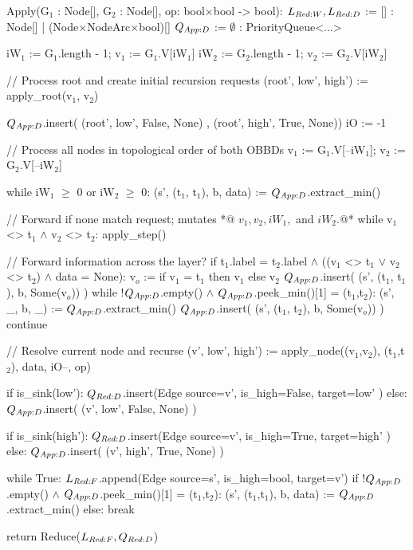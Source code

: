 \begin{blstlisting}
  Apply(G$_1$ : Node[], G$_2$ : Node[], op: bool$\times$bool ->    bool):
    $\ReduceLwork, \ReduceLdep$ := [] : Node[] | (Node$\times$NodeArc$\times$bool)[]
    $\ApplyQrec$ := $\emptyset$ : PriorityQueue<...>

    iW$_1$ := G$_1$.length - 1; v$_1$ := G$_1$.V[iW$_1$]
    iW$_2$ := G$_2$.length - 1; v$_2$ := G$_2$.V[iW$_2$]

    // Process root and create initial recursion requests
    (root', low', high') := apply_root(v$_1$, v$_2$)

    $\ApplyQrec$.insert( (root', low', False, None)
                , (root', high', True, None))
    iO := -1

    // Process all nodes in topological order of both OBBDs
    v$_1$ := G$_1$.V[--iW$_1$]; v$_2$ := G$_2$.V[--iW$_2$]

    while iW$_1$ $\geq$ 0 or iW$_2$ $\geq$ 0:
      (s', (t$_1$, t$_1$), b, data) := $\ApplyQrec$.extract_min()

      // Forward if none match request; mutates *@\color{gray} $v_1, v_2, \mathit{iW}_1,$ and $\mathit{iW}_2$.@*
      while v$_1$ <>  t$_1$ $\land$ v$_2$ <>   t$_2$: apply_step()

      // Forward information across the layer?
      if t$_1$.label = t$_2$.label $\land$ ((v$_1$ <>    t$_1$ $\lor$ v$_2$ <>   t$_2$) $\land$ data = None):
        v$_o$ :=  if v$_1$ = t$_1$ then v$_1$ else v$_2$
        $\ApplyQrec$.insert( (s', (t$_1$, t$_1$), b, Some(v$_o$)) )
        while !$\ApplyQrec$.empty() $\land$ $\ApplyQrec$.peek_min()[1] = (t$_1$,t$_2$):
          (s', _, b, _) := $\ApplyQrec$.extract_min()
          $\ApplyQrec$.insert( (s', (t$_1$, t$_2$), b, Some(v$_o$)) )
        continue

      // Resolve current node and recurse
      (v', low', high') := apply_node((v$_1$,v$_2$), (t$_1$,t$_2$), data, iO--, op)
      
      if is_sink(low'):
        $\ReduceQdep$.insert(Edge{ source=v', is_high=False, target=low' })
      else:
        $\ApplyQrec$.insert( (v', low', False, None) )

      if is_sink(high'):
        $\ReduceQdep$.insert(Edge{ source=v', is_high=True, target=high' })
      else:
        $\ApplyQrec$.insert( (v', high', True, None) )

      while True:
        $\ReduceLforward$.append(Edge{ source=s', is_high=bool, target=v'})
        if !$\ApplyQrec$.empty() $\land$ $\ApplyQrec$.peek_min()[1] = (t$_1$,t$_2$):
          (s', (t$_1$,t$_1$), b, data) := $\ApplyQrec$.extract_min()
        else: break

    return Reduce($\ReduceLforward, \ReduceQdep$)
\end{blstlisting}
